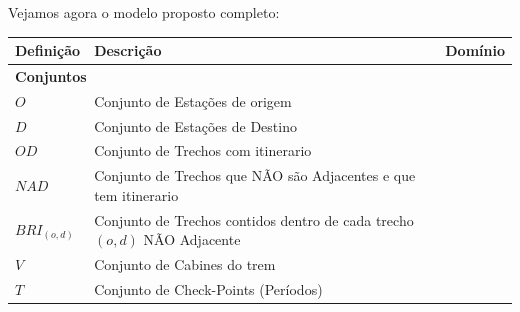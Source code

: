 Vejamos agora o modelo proposto completo:

\begin{table}[H]
	\centering
	\small
	\begin{tabular}{p{2cm} p{9.5cm} p{3.2cm}}
		\toprule
		\textbf{Definição} & \textbf{Descrição}                                                                                                                                            & \textbf{Domínio}                             \\ \midrule
		\multicolumn{3}{l}{\textbf{Conjuntos}}                                                                                                                                                                                          \\ \midrule
		$O$                & Conjunto de Estações de origem                                                                                                                          &                                              \\
		$D$                & Conjunto de Estações de Destino                                                                                                                          &                                              \\
		$OD$               & Conjunto de Trechos com itinerario                                                                                                                          &                                              \\
		$NAD$              & Conjunto de Trechos que NÃO são Adjacentes e que tem itinerario                                                                                             &                                              \\
		$BRI_{(o,d)}$      & Conjunto de Trechos contidos dentro de cada trecho $(o,d)$ NÃO Adjacente                                                                                    &                                              \\
		$V$                & Conjunto de Cabines do trem                                                                                                                                 &                                              \\
		$T$                & Conjunto de Check-Points (Períodos)                                                                                                                         &                                              \\ 

\end{tabular}
\end{table}
